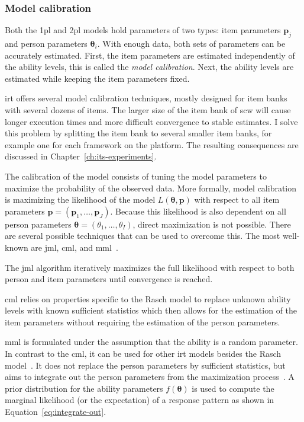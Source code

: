 \subsubsection{Model calibration}
Both the \gls{1pl} and \gls{2pl} models hold parameters of two types: item parameters $\bm{p}_j$ and person parameters $\bm{\theta}_i$. 
With enough data, both sets of parameters can be accurately estimated.
First, the item parameters are estimated independently of the ability levels, this is called the \textit{model calibration}. 
Next, the ability levels are estimated while keeping the item parameters fixed.

\Gls{irt} offers several model calibration techniques, mostly designed for item banks with several dozens of items.
The larger size of the item bank of \gls{scw} will cause longer execution times and more difficult convergence to stable estimates.
I solve this problem by splitting the item bank to several smaller item banks, for example one for each framework on the platform.
The resulting consequences are discussed in Chapter~\ref{ch:its-experiments}.

The calibration of the model consists of tuning the model parameters to maximize the probability of the observed data.
More formally, model calibration is maximizing the likelihood of the model $L(\bm\theta,\bm{p})$ with respect to all item parameters $\bm{p} = (\bm{p}_1,\dots,\bm{p}_J)$.
Because this likelihood is also dependent on all person parameters $\bm\theta = (\theta_1,\dots,\theta_I)$, direct maximization is not possible.
There are several possible techniques that can be used to overcome this.
The most well-known are \gls{jml}, \gls{cml}, and \gls{mml}~\cite{magis2017computerized}.

The \gls{jml} algorithm iteratively maximizes the full likelihood with respect to both person and item parameters until convergence is reached.

\Gls{cml} relies on properties specific to the Rasch model to replace unknown ability levels with known sufficient statistics which then allows for the estimation of the item parameters without requiring the estimation of the person parameters.

\Gls{mml} is formulated under the assumption that the ability is a random parameter.
In contrast to the \gls{cml}, it can be used for other \gls{irt} models besides the Rasch model~\cite{bartolucci2010point}.
It does not replace the person parameters by sufficient statistics, but aims to integrate out the person parameters from the maximization process~\cite{bartolucci2010point,magis2017computerized}.
A prior distribution for the ability parameters $f(\bm{\theta})$ is used to compute the marginal likelihood (or the expectation) of a response pattern as shown in Equation~\ref{eq:integrate-out}.

